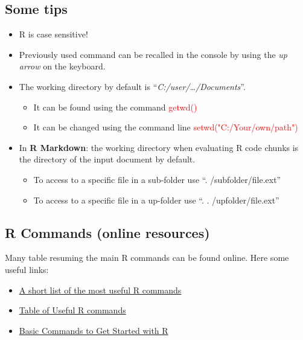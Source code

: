 \documentclass[
]{book}
\providecommand{\tightlist}{%
  \setlength{\itemsep}{0pt}\setlength{\parskip}{0pt}}
\theoremstyle{definition}
\theoremstyle{definition}
\theoremstyle{definition}
\theoremstyle{definition}
\theoremstyle{remark}
\begin{document}
\hypertarget{some-tips}{%
\subsection{Some tips}\label{some-tips}}

\begin{itemize}
\tightlist
\item
  R is case sensitive!
\item
  Previously used command can be recalled in the console by using the \emph{up arrow} on the keyboard.
\item
  The working directory by default is ``\emph{C:/user/\ldots/Documents}''.

  \begin{itemize}
  \tightlist
  \item
    It can be found using the command \textcolor{red}{getwd()}
  \item
    It can be changed using the command line \textcolor{red}{setwd("C:/Your/own/path")}
  \end{itemize}
\item
  In \textbf{R Markdown}: the working directory when evaluating R code chunks is the directory of the input document by default.

  \begin{itemize}
  \tightlist
  \item
    To access to a specific file in a sub-folder use ``. /subfolder/file.ext''
  \item
    To access to a specific file in a up-folder use ``. . /upfolder/file.ext''
  \end{itemize}
\end{itemize}

\hypertarget{r-commands-online-resources}{%
\subsection{R Commands (online resources)}\label{r-commands-online-resources}}

Many table resuming the main R commands can be found online.
Here some useful links:

\begin{itemize}
\item
  \href{https://www.maths.usyd.edu.au/u/jchan/Rcommands.pdf}{A short list of the most useful R commands}
\item
  \href{https://sites.calvin.edu/scofield/courses/m143/materials/RcmdsFromClass.pdf}{Table of Useful R commands}
\item
  \href{https://rpubs.com/ssammut/ResearchStats}{Basic Commands to Get Started with R}
\end{itemize}
\end{document}
